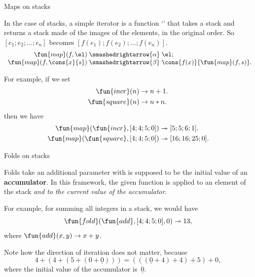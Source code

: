%
\begin{frame}{Maps on stacks}

  In the case of stacks, a simple iterator is a function `'
  that takes a stack and returns a stack made of the images of the
  elements, in the original order. So $[e_1; e_2; \ldots; e_n]$ becomes $[f(e_1);
    f(e_2); \ldots; f(e_n)]$.
  \begin{equation*}
    \begin{array}{r@{\;}l@{\;}l@{}}
      \fun{map}(f, \el) &\smashedrightarrow{\alpha} & \el;\\
      \fun{map}(f, \cons{x}{s}) &\smashedrightarrow{\beta}
      & \cons{f(x)}{\fun{map}(f, s)}.
    \end{array}
  \end{equation*}

  For example, if we set
  \begin{align*}
    \fun{incr}(n)   &\rightarrow n + 1.\\
    \fun{square}(n) &\rightarrow n * n.
  \end{align*}
  then we have
  \begin{align*}
    \fun{map}(\fun{incr}, [4; 4; 5; 0]) &\twoheadrightarrow [5; 5; 6; 1].\\
    \fun{map}(\fun{square}, [4; 4; 5; 0]) &\twoheadrightarrow [16; 16; 25; 0].
  \end{align*}

\end{frame}

%
\begin{frame}{Folds on stacks}

  Folds take an additional parameter with is supposed to be the
  initial value of an \textbf{accumulator}. In this framework, the
  given function is applied to an element of the stack \emph{and to the
  current value of the accumulator}.

  \bigskip

  For example, for summing all integers in a stack, we would have
  \begin{equation*}
    \fun{fold} (\fun{add}, [4; 4; 5; 0], 0) \twoheadrightarrow 13,
  \end{equation*}
  where $\fun{add}(x,y) \rightarrow x + y$.

  \bigskip

  Note how the direction of iteration does not matter, because
  \begin{equation*}
    4 + (4 + (5 + (0 + \underline{0})))
    = (((\underline{0} + 4) + 4) + 5) + 0,
  \end{equation*}
  where the initial value of the accumulator is~\(\underline{0}\).

\end{frame}

